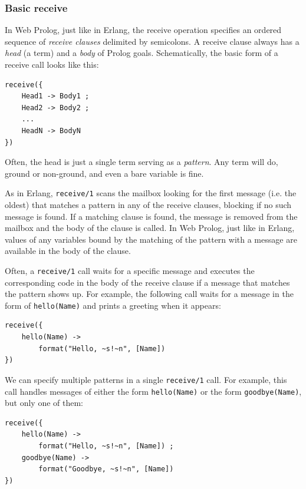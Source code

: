 \subsubsection{Basic receive}

In Web Prolog, just like in Erlang, the receive operation specifies an ordered sequence of \textit{receive clauses} delimited by semicolons. A receive clause always has a \textit{head} (a term) and a \textit{body} of Prolog goals. Schematically, the basic form of a receive call looks like this:

\begin{verbatim}
receive({  
    Head1 -> Body1 ;
    Head2 -> Body2 ;
    ...
    HeadN -> BodyN
})
\end{verbatim}

\noindent Often, the head is just a single term serving as a \textit{pattern}. Any term will do, ground or non-ground, and even a bare variable is fine.

As in Erlang, \texttt{receive/1} scans the mailbox looking for the first message (i.e. the oldest) that matches a pattern in any of the receive clauses, blocking if no such message is found. If a matching clause is found, the message is removed from the mailbox and the body of the clause is called. In Web Prolog, just like in Erlang, values of any variables bound by the matching of the pattern with a message are available in the body of the clause.

Often, a \texttt{receive/1} call waits for a specific
message and executes the corresponding code in the body of the receive clause if a message that matches the pattern shows up. For example, the following call waits for a message in the form of \texttt{hello(Name)} and prints a greeting when it appears:

\begin{verbatim}
receive({
    hello(Name) ->
        format("Hello, ~s!~n", [Name])
})
\end{verbatim}

\noindent We can specify multiple patterns in a single \texttt{receive/1} call. For example, this call handles messages of either the form \texttt{hello(Name)} or the form \texttt{goodbye(Name)}, but only one of them:

\begin{verbatim}
receive({
    hello(Name) ->
        format("Hello, ~s!~n", [Name]) ;
    goodbye(Name) ->
        format("Goodbye, ~s!~n", [Name])
})
\end{verbatim}

